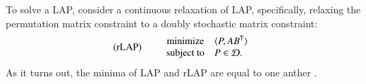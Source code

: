 \documentclass[preprint,11pt]{elsarticle}
\begin{document}
To solve a LAP, consider a continuous relaxation of LAP, specifically, relaxing the permutation matrix constraint to a doubly stochastic matrix constraint:
\begin{equation}
\text{(rLAP)} \qquad  
\begin{array}{cl}
			\text{minimize}   & \langle P, AB^{\mathsf{T}} \rangle \\
			\text{subject to}  &P \in \mathcal{D}.   
\end{array}\label{eq:LAP}
\end{equation}
As it turns out, the minima of LAP and rLAP are equal to one anther \cite{Burkard2009}.
\end{document}
